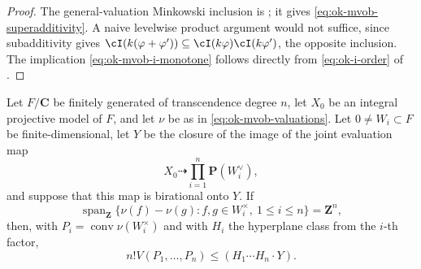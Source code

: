 \begin{proof}
The general-valuation Minkowski inclusion is
\cite[Proposition~10.3.10]{XiaBook}; it gives
\eqref{eq:ok-mvob-superadditivity}.  A naive levelwise product argument
would not suffice, since subadditivity gives
\(\cI(k(\varphi+\varphi'))
 \subseteq\cI(k\varphi)\cI(k\varphi')\), the opposite inclusion.
The implication \eqref{eq:ok-mvob-i-monotone} follows directly from
\eqref{eq:ok-i-order} of .
\end{proof}

\begin{lemma}\label{lem:ok-mvob-finite-level}
Let \(F/\mathbf C\) be finitely generated of transcendence degree \(n\),
let \(X_0\) be an integral projective model of \(F\), and let \(\nu\) be as
in \eqref{eq:ok-mvob-valuations}.  Let
\(0\ne W_i\subset F\) be finite-dimensional, let \(Y\) be the closure of
the image of the joint evaluation map
\[
 X_0\dashrightarrow\prod_{i=1}^n\mathbf P(W_i^\vee),
\]
and suppose that this map is birational onto \(Y\).  If
\[
 \operatorname{span}_{\mathbf Z}
 \{\nu(f)-\nu(g):f,g\in W_i^\times,\ 1\leq i\leq n\}
 =\mathbf Z^n,
\tag{55.31}\label{eq:ok-mvob-finite-level-degree}
\]
then, with \(P_i=\operatorname{conv}\nu(W_i^\times)\) and with \(H_i\)
the hyperplane class from the \(i\)-th factor,
\[
 n!V(P_1,\ldots,P_n)\leq(H_1\cdots H_n\cdot Y).
\tag{55.32}\label{eq:ok-mvob-admissible}
\]
\end{lemma}

